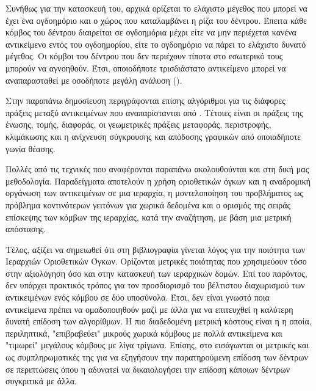 \begin{itemize}
    Συνήθως για την κατασκευή του, αρχικά ορίζεται το ελάχιστο μέγεθος που μπορεί να 
    έχει ένα ογδοημόριο και ο χώρος που καταλαμβάνει η ρίζα του δέντρου. 
    Έπειτα κάθε κόμβος του  δέντρου 
    διαιρείται σε ογδοημόρια μέχρι είτε να μην περιέχεται κανένα αντικείμενο 
    εντός του ογδοημορίου, είτε το ογδοημόριο να πάρει το ελάχιστο δυνατό μέγεθος.
    Οι κόμβοι του δέντρου που δεν περιέχουν τίποτα στο εσωτερικό τους μπορούν να αγνοηθούν.
    Έτσι, οποιοδήποτε τρισδιάστατο αντικείμενο μπορεί να αναπαρασταθεί με οσοδήποτε 
    μεγάλη ανάλυση ().

    Στην παραπάνω δημοσίευση περιγράφονται επίσης αλγόριθμοι για τις διάφορες 
    πράξεις μεταξύ αντικειμένων που αναπαρίστανται από .
    Τέτοιες είναι οι πράξεις της ένωσης, τομής, διαφοράς, οι γεωμετρικές πράξεις 
    μεταφοράς, περιστροφής, κλιμάκωσης και η ανίχνευση σύγκρουσης και απόδοσης γραφικών 
    από οποιαδήποτε γωνία θέασης. 
\end{itemize}

Πολλές από τις τεχνικές που αναφέρονται παραπάνω ακολουθούνται και 
στη δική μας μεθοδολογία.
Παραδείγματα αποτελούν η χρήση οριοθετικών όγκων και η αναδρομική οργάνωση 
των αντικειμένων σε μια ιεραρχία, η μοντελοποίηση του προβλήματος 
ως πρόβλημα κοντινότερων γειτόνων για χωρικά δεδομένα και ο 
ορισμός της σειράς επίσκεψης των κόμβων της ιεραρχίας, κατά την αναζήτηση, με 
βάση μια μετρική απόστασης.

Τέλος, αξίζει να σημειωθεί ότι στη βιβλιογραφία γίνεται λόγος για την 
ποιότητα των Ιεραρχιών Οριοθετικών Όγκων. 
Ορίζονται μετρικές ποιότητας που χρησιμεύουν τόσο στην αξιολόγηση όσο 
και στην κατασκευή των ιεραρχικών δομών.
Επί του παρόντος, δεν υπάρχει πρακτικός τρόπος για τον προσδιορισμό 
του βέλτιστου διαχωρισμού των αντικειμένων ενός κόμβου σε δύο υποσύνολα.
Έτσι, δεν είναι γνωστό ποια αντικείμενα πρέπει να ομαδοποιηθούν μαζί
με άλλα για να επιτευχθεί η καλύτερη δυνατή επίδοση των αλγορίθμων.
Η πιο διαδεδομένη μετρική κόστους είναι η 
\textit{} 
\cite{goldsmith1987automatic} \cite{macdonald1990heuristics}
η οποία, περιληπτικά, "επιβραβεύει" μικρούς χωρικά κόμβους με πολλά 
αντικείμενα και "τιμωρεί" μεγάλους κόμβους με λίγα τρίγωνα. 
Επίσης, στο \cite{aila2013quality} εισάγωνται οι μετρικές 
 και 
 ως συμπληρωματικές 
της  για να εξηγήσουν την παρατηρούμενη επίδοση 
των δέντρων σε περιπτώσεις όπου η  αδυνατεί να 
δικαιολογήσει την επίδοση κάποιων δέντρων συγκριτικά 
με άλλα.
